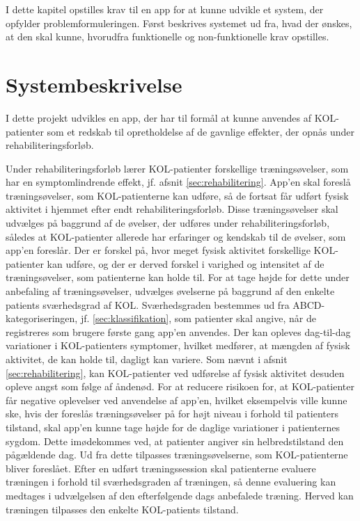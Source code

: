 I dette kapitel opstilles krav til en app for at kunne udvikle et system, der opfylder problemformuleringen. Først beskrives systemet ud fra, hvad der ønskes, at den skal kunne, hvorudfra funktionelle og non-funktionelle krav opstilles.

\section{Systembeskrivelse} \label{sec:systembeskrivelse}
I dette projekt udvikles en app, der har til formål at kunne anvendes af KOL-patienter som et redskab til opretholdelse af de gavnlige effekter, der opnås under rehabiliteringsforløb.

Under rehabiliteringsforløb lærer KOL-patienter forskellige træningsøvelser, som har en symptomlindrende effekt, jf. afsnit \ref{sec:rehabilitering}. App’en skal foreslå træningsøvelser, som KOL-patienterne kan udføre, så de fortsat får udført fysisk aktivitet i hjemmet efter endt rehabiliteringsforløb. Disse træningsøvelser skal udvælges på baggrund af de øvelser, der udføres under rehabiliteringsforløb, således at KOL-patienter allerede har erfaringer og kendskab til de øvelser, som app’en foreslår.
Der er forskel på, hvor meget fysisk aktivitet forskellige KOL-patienter kan udføre, og der er derved forskel i varighed og intensitet af de træningsøvelser, som patienterne kan holde til. For at tage højde for dette under anbefaling af træningsøvelser, udvælges øvelserne på baggrund af den enkelte patients sværhedsgrad af KOL. Sværhedsgraden bestemmes ud fra ABCD-kategoriseringen, jf. \ref{sec:klassifikation}, som patienter skal angive, når de registreres som brugere første gang app'en anvendes. Der kan opleves dag-til-dag variationer i KOL-patienters symptomer, hvilket medfører, at mængden af fysisk aktivitet, de kan holde til, dagligt kan variere. Som nævnt i afsnit \ref{sec:rehabilitering}, kan KOL-patienter ved udførelse af fysisk aktivitet desuden opleve angst som følge af åndenød. For at reducere risikoen for, at KOL-patienter får negative oplevelser ved anvendelse af app’en, hvilket eksempelvis ville kunne ske, hvis der foreslås træningsøvelser på for højt niveau i forhold til patienters tilstand, skal app’en kunne tage højde for de daglige variationer i patienternes sygdom. Dette imødekommes ved, at patienter angiver sin helbredstilstand den pågældende dag. Ud fra dette tilpasses træningsøvelserne, som KOL-patienterne bliver foreslået. Efter en udført træningssession skal patienterne evaluere træningen i forhold til sværhedsgraden af træningen, så denne evaluering kan medtages i udvælgelsen af den efterfølgende dags anbefalede træning. Herved kan træningen tilpasses den enkelte KOL-patients tilstand.

